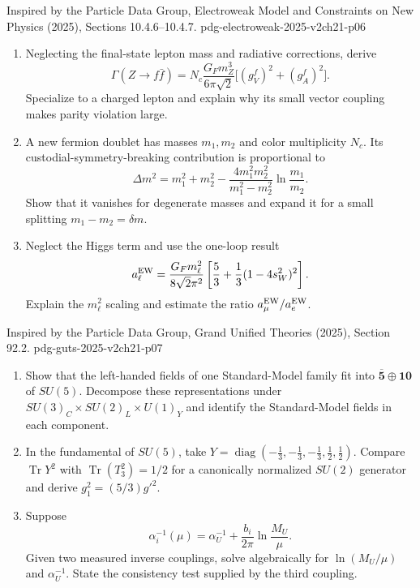 \begin{enumerate}
  {Inspired by the Particle Data Group, Electroweak Model and
  Constraints on New Physics (2025), Sections 10.4.6--10.4.7.}
  {pdg-electroweak-2025-v2ch21-p06}
  \begin{enumerate}
    \item[(a)]
    Neglecting the final-state lepton mass and radiative corrections,
    derive
    \[
      \Gamma(Z\to f\bar f)
        =N_c\frac{G_Fm_Z^3}{6\pi\sqrt2}
         \bigl[(g_V^f)^2+(g_A^f)^2\bigr].
    \]
    Specialize to a charged lepton and explain why its small vector
    coupling makes parity violation large.
    \item[(b)]
    A new fermion doublet has masses \(m_1,m_2\) and color multiplicity
    \(N_c\).  Its custodial-symmetry-breaking contribution is proportional
    to
    \[
      \Delta m^2=m_1^2+m_2^2
        -\frac{4m_1^2m_2^2}{m_1^2-m_2^2}\ln\frac{m_1}{m_2}.
    \]
    Show that it vanishes for degenerate masses and expand it for a small
    splitting \(m_1-m_2=\delta m\).
    \item[(c)]
    Neglect the Higgs term and use the one-loop result
    \[
      a_\ell^{\rm EW}
        =\frac{G_Fm_\ell^2}{8\sqrt2\pi^2}
         \left[\frac53+\frac13(1-4s_W^2)^2\right].
    \]
    Explain the \(m_\ell^2\) scaling and estimate the ratio
    \(a_\mu^{\rm EW}/a_e^{\rm EW}\).
  \end{enumerate}

  {Inspired by the Particle Data Group, Grand Unified Theories (2025),
  Section 92.2.}
  {pdg-guts-2025-v2ch21-p07}
  \begin{enumerate}
    \item[(a)]
    Show that the left-handed fields of one Standard-Model family fit into
    \(\overline{\mathbf5}\oplus\mathbf{10}\) of \(SU(5)\).  Decompose
    these representations under
    \(SU(3)_C\times SU(2)_L\times U(1)_Y\) and identify the Standard-Model
    fields in each component.
    \item[(b)]
    In the fundamental of \(SU(5)\), take
    \(Y=\operatorname{diag}(-\tfrac13,-\tfrac13,-\tfrac13,
    \tfrac12,\tfrac12)\).  Compare \(\operatorname{Tr}Y^2\) with
    \(\operatorname{Tr}(T_3^2)=1/2\) for a canonically normalized
    \(SU(2)\) generator and derive \(g_1^2=(5/3)g'^2\).
    \item[(c)]
    Suppose
    \[
      \alpha_i^{-1}(\mu)
        =\alpha_U^{-1}+\frac{b_i}{2\pi}\ln\frac{M_U}{\mu}.
    \]
    Given two measured inverse couplings, solve algebraically for
    \(\ln(M_U/\mu)\) and \(\alpha_U^{-1}\).  State the consistency test
    supplied by the third coupling.
  \end{enumerate}


\end{enumerate}
